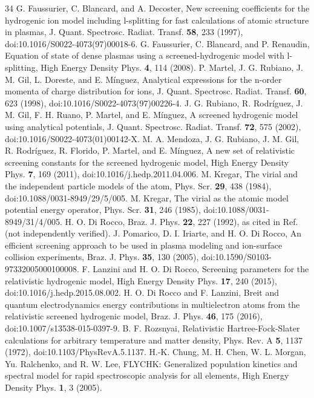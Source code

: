 \documentclass[aps,pra,preprint,superscriptaddress,amsmath,amssymb]{revtex4-2}
\begin{document}
\begin{thebibliography}{34}
 G. Faussurier, C. Blancard, and A. Decoster, New screening coefficients for the hydrogenic ion model including l-splitting for fast calculations of atomic structure in plasmas, J. Quant. Spectrosc. Radiat. Transf. \textbf{58}, 233 (1997), doi:10.1016/S0022-4073(97)00018-6.
 G. Faussurier, C. Blancard, and P. Renaudin, Equation of state of dense plasmas using a screened-hydrogenic model with l-splitting, High Energy Density Phys. \textbf{4}, 114 (2008).
 P. Martel, J. G. Rubiano, J. M. Gil, L. Doreste, and E. Mínguez, Analytical expressions for the n-order momenta of charge distribution for ions, J. Quant. Spectrosc. Radiat. Transf. \textbf{60}, 623 (1998), doi:10.1016/S0022-4073(97)00226-4.
 J. G. Rubiano, R. Rodríguez, J. M. Gil, F. H. Ruano, P. Martel, and E. Mínguez, A screened hydrogenic model using analytical potentials, J. Quant. Spectrosc. Radiat. Transf. \textbf{72}, 575 (2002), doi:10.1016/S0022-4073(01)00142-X.
 M. A. Mendoza, J. G. Rubiano, J. M. Gil, R. Rodríguez, R. Florido, P. Martel, and E. Mínguez, A new set of relativistic screening constants for the screened hydrogenic model, High Energy Density Phys. \textbf{7}, 169 (2011), doi:10.1016/j.hedp.2011.04.006.
 M. Kregar, The virial and the independent particle models of the atom, Phys. Scr. \textbf{29}, 438 (1984), doi:10.1088/0031-8949/29/5/005.
 M. Kregar, The virial as the atomic model potential energy operator, Phys. Scr. \textbf{31}, 246 (1985), doi:10.1088/0031-8949/31/4/005.
 H. O. Di Rocco, Braz. J. Phys. \textbf{22}, 227 (1992), as cited in Ref.~\cite{r20} (not independently verified).
 J. Pomarico, D. I. Iriarte, and H. O. Di Rocco, An efficient screening approach to be used in plasma modeling and ion-surface collision experiments, Braz. J. Phys. \textbf{35}, 130 (2005), doi:10.1590/S0103-97332005000100008.
 F. Lanzini and H. O. Di Rocco, Screening parameters for the relativistic hydrogenic model, High Energy Density Phys. \textbf{17}, 240 (2015), doi:10.1016/j.hedp.2015.08.002.
 H. O. Di Rocco and F. Lanzini, Breit and quantum electrodynamics energy contributions in multielectron atoms from the relativistic screened hydrogenic model, Braz. J. Phys. \textbf{46}, 175 (2016), doi:10.1007/s13538-015-0397-9.
 B. F. Rozsnyai, Relativistic Hartree-Fock-Slater calculations for arbitrary temperature and matter density, Phys. Rev. A \textbf{5}, 1137 (1972), doi:10.1103/PhysRevA.5.1137.
 H.-K. Chung, M. H. Chen, W. L. Morgan, Yu. Ralchenko, and R. W. Lee, FLYCHK: Generalized population kinetics and spectral model for rapid spectroscopic analysis for all elements, High Energy Density Phys. \textbf{1}, 3 (2005).

\end{thebibliography}
\end{document}
